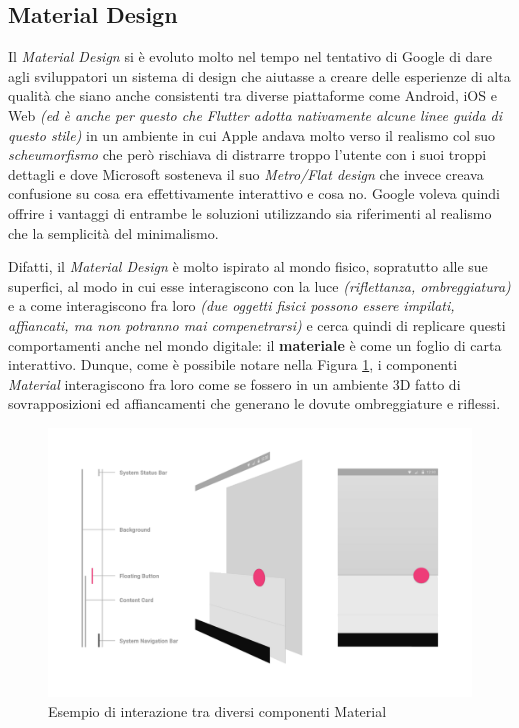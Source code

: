 \subsection{Material Design}
Il \textit{Material Design} si è evoluto molto nel tempo nel tentativo di Google di dare agli sviluppatori un sistema di design che aiutasse a creare delle esperienze di alta qualità che siano anche consistenti tra diverse piattaforme come Android, iOS e Web \textit{(ed è anche per questo che Flutter adotta nativamente alcune linee guida di questo stile)} in un ambiente in cui Apple andava molto verso il realismo col suo \textit{scheumorfismo} che però rischiava di distrarre troppo l'utente con i suoi troppi dettagli e dove Microsoft sosteneva il suo \textit{Metro/Flat design} che invece creava confusione su cosa era effettivamente interattivo e cosa no. Google voleva quindi offrire i vantaggi di entrambe le soluzioni utilizzando sia riferimenti al realismo che la semplicità del minimalismo.

\newpage

Difatti, il \textit{Material Design} è molto ispirato al mondo fisico, sopratutto alle sue superfici, al modo in cui esse interagiscono con la luce \textit{(riflettanza, ombreggiatura)} e a come interagiscono fra loro \textit{(due oggetti fisici possono essere impilati, affiancati, ma non potranno mai compenetrarsi)} e cerca quindi di replicare questi comportamenti anche nel mondo digitale: il \textbf{materiale} è come un foglio di carta interattivo.
Dunque, come è possibile notare nella Figura \ref{fig:material_example}, i componenti \textit{Material} interagiscono fra loro come se fossero in un ambiente 3D fatto di sovrapposizioni ed affiancamenti che generano le dovute ombreggiature e riflessi.

\begin{figure}[h]
\centering
\includegraphics[width=1\textwidth]{img/material_example}
\caption{Esempio di interazione tra diversi componenti Material}
\label{fig:material_example}
\end{figure}


